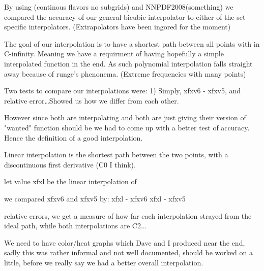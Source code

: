 By using  (continous flavors no subgrids) and NNPDF2008(something)
we compared the accuracy of our general bicubic interpolator to either
of the set specific interpolators. (Extrapolators have been ingored
for the moment)

The goal of our interpolation is to have a shortest path between all
points with in C-infinity. Meaning we have a requirment of having
hopefully a simple interpolated function in the end. As such polynomial
interpolation falls straight away because of runge's phenonema.
(Extreme frequencies with many points)

Two tests to compare our interpolations were:
1) Simply, xfxv6 - xfxv5, and relative error\dots Showed us how we
differ from each other.

However since both are interpolating and both are just giving their
version of "wanted" function should be we had to come up with a better
test of accuracy. Hence the definition of a good interpolation.

Linear interpolation is the shortest path between the two points,
with a discontinuous first derivative (C0 I think).

let value xfxl be the linear interpolation of \xqsq

we compared xfxv6 and xfxv5 by:
xfxl - xfxv6
xfxl - xfxv5

relative errors, we get a measure of how far each interpolation strayed
from the ideal path, while both interpolations are C2...

We need to have color/heat graphs which Dave and I produced near the
end, sadly this was rather informal and not well documented, should be
worked on a little, before we really say we had a better overall
interpolation.
